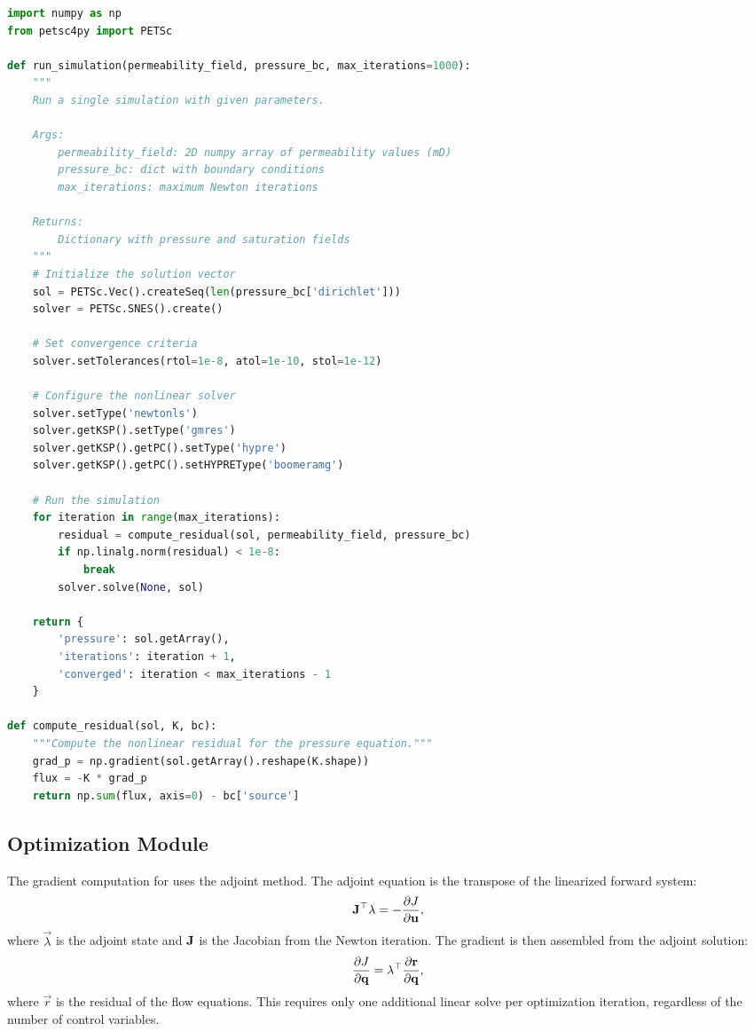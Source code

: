 \begin{lstlisting}[language=Python, caption={Python wrapper for running parametric studies.}, label={lst:python_wrapper}]
import numpy as np
from petsc4py import PETSc

def run_simulation(permeability_field, pressure_bc, max_iterations=1000):
    """
    Run a single simulation with given parameters.

    Args:
        permeability_field: 2D numpy array of permeability values (mD)
        pressure_bc: dict with boundary conditions
        max_iterations: maximum Newton iterations

    Returns:
        Dictionary with pressure and saturation fields
    """
    # Initialize the solution vector
    sol = PETSc.Vec().createSeq(len(pressure_bc['dirichlet']))
    solver = PETSc.SNES().create()

    # Set convergence criteria
    solver.setTolerances(rtol=1e-8, atol=1e-10, stol=1e-12)

    # Configure the nonlinear solver
    solver.setType('newtonls')
    solver.getKSP().setType('gmres')
    solver.getKSP().getPC().setType('hypre')
    solver.getKSP().getPC().setHYPREType('boomeramg')

    # Run the simulation
    for iteration in range(max_iterations):
        residual = compute_residual(sol, permeability_field, pressure_bc)
        if np.linalg.norm(residual) < 1e-8:
            break
        solver.solve(None, sol)

    return {
        'pressure': sol.getArray(),
        'iterations': iteration + 1,
        'converged': iteration < max_iterations - 1
    }

def compute_residual(sol, K, bc):
    """Compute the nonlinear residual for the pressure equation."""
    grad_p = np.gradient(sol.getArray().reshape(K.shape))
    flux = -K * grad_p
    return np.sum(flux, axis=0) - bc['source']
\end{lstlisting}

\subsection{Optimization Module}
\label{ssec:methodology:optimization_module}

The gradient computation for  uses the adjoint method. The adjoint equation is the transpose of the linearized forward system:
\begin{equation}
    \mathbf{J}^\top \mathbf{\lambda} = -\frac{\partial J}{\partial \mathbf{u}},
    \label{eq:adjoint}
\end{equation}
where $\vec{\lambda}$ is the adjoint state and $\mathbf{J}$ is the Jacobian from the Newton iteration. The gradient is then assembled from the adjoint solution:
\begin{equation}
    \frac{\partial J}{\partial \mathbf{q}} = \mathbf{\lambda}^\top \frac{\partial \mathbf{r}}{\partial \mathbf{q}},
    \label{eq:gradient}
\end{equation}
where $\vec{r}$ is the residual of the flow equations. This requires only one additional linear solve per optimization iteration, regardless of the number of control variables.

